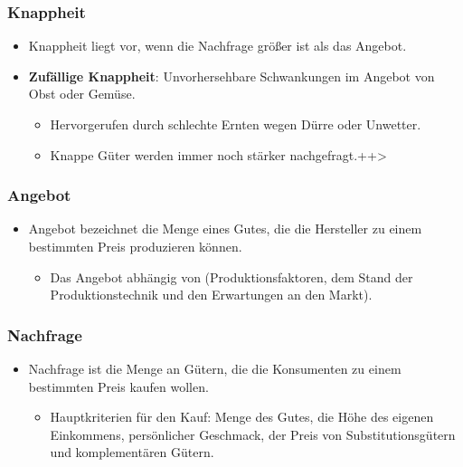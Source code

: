 \documentclass{beamer}
\begin{document}
\begin{frame}
\frametitle{Knappheit}
  \begin{itemize}
    \item
  Knappheit liegt vor, wenn die Nachfrage größer ist als
  das Angebot.
    \item
      \textbf{Zufällige Knappheit}: Unvorhersehbare Schwankungen
  im Angebot von Obst oder Gemüse.
      \begin{itemize}
        \item
  Hervorgerufen durch schlechte Ernten wegen Dürre oder
  Unwetter.
\item
Knappe Güter werden immer noch stärker nachgefragt.++>
  \end{itemize}
      \end{itemize}
\end{frame}

\begin{frame}
\frametitle{Angebot}
  \begin{itemize}
    \item
Angebot bezeichnet die Menge eines Gutes, die die
Hersteller zu einem bestimmten Preis produzieren
können.
      \begin{itemize}
        \item
  Das Angebot abhängig von (Produktionsfaktoren, dem Stand
  der Produktionstechnik und den Erwartungen an den Markt).
      \end{itemize}
  \end{itemize}
\end{frame}

\begin{frame}
\frametitle{Nachfrage}
  \begin{itemize}
    \item
Nachfrage ist die Menge an Gütern, die die
Konsumenten zu einem bestimmten Preis kaufen wollen.

      \begin{itemize}
        \item
Hauptkriterien für den Kauf: Menge des Gutes, die Höhe des
eigenen Einkommens, persönlicher Geschmack, der Preis von
Substitutionsgütern und komplementären Gütern.
      \end{itemize}
  \end{itemize}
\end{frame}
\end{document}
